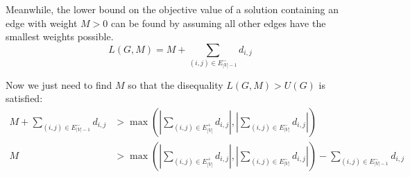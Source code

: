 \documentclass{scrartcl}
\begin{document}
\begin{enumerate}
		Meanwhile, the lower bound on the objective value of a solution containing an edge with weight $M > 0$ can be found by assuming all other edges have the smallest weights possible.
		\[ L(G,M) = M + \sum_{(i,j) \in E_{|V|-1}^-}{d_{i,j}} \]
		
		Now we just need to find $M$ so that the disequality $L(G,M) > U(G)$ is satisfied:
		\begin{align*}
			M + \sum_{(i,j) \in E_{|V|-1}^-}{d_{i,j}} &> \max\left( \left| \sum_{(i,j) \in E_{|V|}^+}{d_{i,j}} \right|, \left| \sum_{(i,j) \in E_{|V|}^-}{d_{i,j}} \right| \right)\\
			M &> \max\left( \left| \sum_{(i,j) \in E_{|V|}^+}{d_{i,j}} \right|, \left| \sum_{(i,j) \in E_{|V|}^-}{d_{i,j}} \right| \right) - \sum_{(i,j) \in E_{|V|-1}^-}{d_{i,j}}
		\end{align*}
	\end{enumerate}
\end{document}
